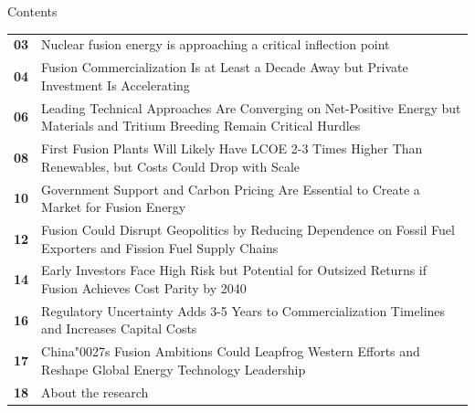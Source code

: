 \documentclass[10pt,a4paper]{article}
\newcommand{\BOApos}{{\BOQuoteFont\char"0027}}
\begin{document}
\clearpage
{\sffamily\fontsize{26}{31}\selectfont\color{BONavy} Contents}\par\vspace{10pt}
\begin{tabularx}{\linewidth}{p{14mm}Y}
\textcolor{BOGreen}{\bfseries 03} & Nuclear fusion energy is approaching a critical inflection point \\[5pt]
\textcolor{BOGreen}{\bfseries 04} & Fusion Commercialization Is at Least a Decade Away but Private Investment Is Accelerating \\[5pt]
\textcolor{BOGreen}{\bfseries 06} & Leading Technical Approaches Are Converging on Net-Positive Energy but Materials and Tritium Breeding Remain Critical Hurdles \\[5pt]
\textcolor{BOGreen}{\bfseries 08} & First Fusion Plants Will Likely Have LCOE 2-3 Times Higher Than Renewables, but Costs Could Drop with Scale \\[5pt]
\textcolor{BOGreen}{\bfseries 10} & Government Support and Carbon Pricing Are Essential to Create a Market for Fusion Energy \\[5pt]
\textcolor{BOGreen}{\bfseries 12} & Fusion Could Disrupt Geopolitics by Reducing Dependence on Fossil Fuel Exporters and Fission Fuel Supply Chains \\[5pt]
\textcolor{BOGreen}{\bfseries 14} & Early Investors Face High Risk but Potential for Outsized Returns if Fusion Achieves Cost Parity by 2040 \\[5pt]
\textcolor{BOGreen}{\bfseries 16} & Regulatory Uncertainty Adds 3-5 Years to Commercialization Timelines and Increases Capital Costs \\[5pt]
\textcolor{BOGreen}{\bfseries 17} & China\BOApos{}s Fusion Ambitions Could Leapfrog Western Efforts and Reshape Global Energy Technology Leadership \\[5pt]
\textcolor{BOGreen}{\bfseries 18} & About the research \\[5pt]
\end{tabularx}
\clearpage
\end{document}
